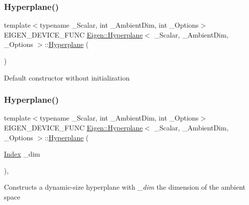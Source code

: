\subsubsection{\texorpdfstring{Hyperplane()}{Hyperplane()}\hspace{0.1cm}{\footnotesize\ttfamily [1/6]}}
{\footnotesize\ttfamily template$<$typename \+\_\+\+Scalar, int \+\_\+\+Ambient\+Dim, int \+\_\+\+Options$>$ \\
E\+I\+G\+E\+N\+\_\+\+D\+E\+V\+I\+C\+E\+\_\+\+F\+U\+NC \mbox{\hyperlink{class_eigen_1_1_hyperplane}{Eigen\+::\+Hyperplane}}$<$ \+\_\+\+Scalar, \+\_\+\+Ambient\+Dim, \+\_\+\+Options $>$\+::\mbox{\hyperlink{class_eigen_1_1_hyperplane}{Hyperplane}} (\begin{DoxyParamCaption}{ }\end{DoxyParamCaption})\hspace{0.3cm}{\ttfamily [inline]}}

Default constructor without initialization \mbox{\label{class_eigen_1_1_hyperplane_a9d99b8b94daa237d51e078e85fe02e2b}} 
\subsubsection{\texorpdfstring{Hyperplane()}{Hyperplane()}\hspace{0.1cm}{\footnotesize\ttfamily [2/6]}}
{\footnotesize\ttfamily template$<$typename \+\_\+\+Scalar, int \+\_\+\+Ambient\+Dim, int \+\_\+\+Options$>$ \\
E\+I\+G\+E\+N\+\_\+\+D\+E\+V\+I\+C\+E\+\_\+\+F\+U\+NC \mbox{\hyperlink{class_eigen_1_1_hyperplane}{Eigen\+::\+Hyperplane}}$<$ \+\_\+\+Scalar, \+\_\+\+Ambient\+Dim, \+\_\+\+Options $>$\+::\mbox{\hyperlink{class_eigen_1_1_hyperplane}{Hyperplane}} (\begin{DoxyParamCaption}\item[{\mbox{\hyperlink{class_eigen_1_1_hyperplane_a58d2307d16128a0026021374e9e10465}{Index}}}]{\+\_\+dim }\end{DoxyParamCaption})\hspace{0.3cm}{\ttfamily [inline]}, {\ttfamily [explicit]}}

Constructs a dynamic-\/size hyperplane with {\itshape \+\_\+dim} the dimension of the ambient space \mbox{\label{class_eigen_1_1_hyperplane_a4ffbf274b428ed80ccb1041db753df74}} 
